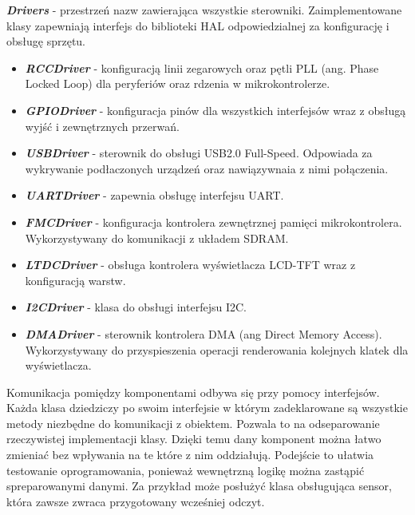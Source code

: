\documentclass[eng,printmode]{mgr}
\begin{document}
\noindent
\textbf{\textit{Drivers}} - przestrzeń nazw zawierająca wszystkie sterowniki. Zaimplementowane klasy zapewniają interfejs do biblioteki HAL odpowiedzialnej za konfigurację i obsługę sprzętu.
\begin{itemize}[label={}]
  \item \textbf{\textit{RCCDriver}} - konfiguracją linii zegarowych oraz pętli PLL (ang. Phase Locked Loop) dla peryferiów oraz rdzenia w mikrokontrolerze. 
  \item \textbf{\textit{GPIODriver}} - konfiguracja pinów dla wszystkich interfejsów wraz z obsługą wyjść i zewnętrznych przerwań.
  \item \textbf{\textit{USBDriver}} - sterownik do obsługi USB2.0 Full-Speed. Odpowiada za wykrywanie podłaczonych urządzeń oraz nawiązywnaia z nimi połączenia.
  \item \textbf{\textit{UARTDriver}} - zapewnia obsługę interfejsu UART.
  \item \textbf{\textit{FMCDriver}} - konfiguracja kontrolera zewnętrznej pamięci mikrokontrolera. Wykorzystywany do komunikacji z układem SDRAM.
  \item \textbf{\textit{LTDCDriver}} - obsługa kontrolera wyświetlacza LCD-TFT wraz z konfiguracją warstw.  
  \item \textbf{\textit{I2CDriver}} - klasa do obsługi interfejsu I2C.
  \item \textbf{\textit{DMADriver}} - sterownik kontrolera DMA (ang Direct Memory Access). Wykorzystywany do przyspieszenia operacji renderowania kolejnych klatek dla wyświetlacza.
\end{itemize}


Komunikacja pomiędzy komponentami odbywa się przy pomocy interfejsów. Każda klasa dziedziczy po swoim interfejsie w którym zadeklarowane są wszystkie metody niezbędne do komunikacji z obiektem. Pozwala to na odseparowanie rzeczywistej implementacji klasy. Dzięki temu dany komponent można łatwo zmieniać bez wpływania na te które z nim oddziałują. Podejście to ułatwia testowanie oprogramowania, ponieważ wewnętrzną logikę można zastąpić spreparowanymi danymi. Za przykład może posłużyć klasa obsługująca sensor, która zawsze zwraca przygotowany wcześniej odczyt. 
\end{document}
